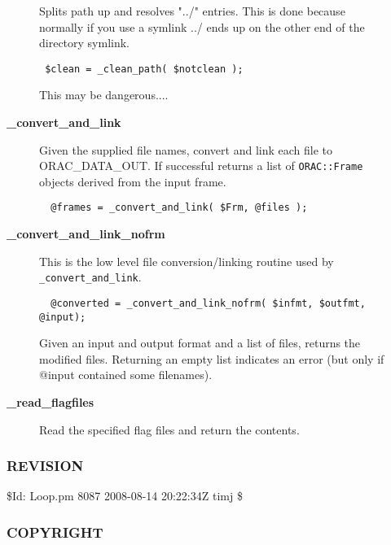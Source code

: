 \begin{description}
\begin{description}
Splits path up and resolves "../" entries. This is done because normally if you
use a symlink ../ ends up on the other end of the directory symlink.

\begin{verbatim}
 $clean = _clean_path( $notclean );
\end{verbatim}


This may be dangerous....


\item[{\textbf{\_convert\_and\_link}}] \mbox{}

Given the supplied file names, convert and link each file to ORAC\_DATA\_OUT.
If successful returns a list of \texttt{ORAC::Frame} objects derived from the input frame.

\begin{verbatim}
  @frames = _convert_and_link( $Frm, @files );
\end{verbatim}

\item[{\textbf{\_convert\_and\_link\_nofrm}}] \mbox{}

This is the low level file conversion/linking routine used by
\texttt{\_convert\_and\_link}.

\begin{verbatim}
  @converted = _convert_and_link_nofrm( $infmt, $outfmt, @input);
\end{verbatim}


Given an input and output format and a list of files, returns
the modified files. Returning an empty list indicates an error (but
only if @input contained some filenames).


\item[{\textbf{\_read\_flagfiles}}] \mbox{}

Read the specified flag files and return the contents.

\end{description}
\subsubsection*{REVISION\label{ORAC::Loop_REVISION}}


\$Id: Loop.pm 8087 2008-08-14 20:22:34Z timj \$

\subsubsection*{COPYRIGHT\label{ORAC::Loop_COPYRIGHT}}



\end{description}

